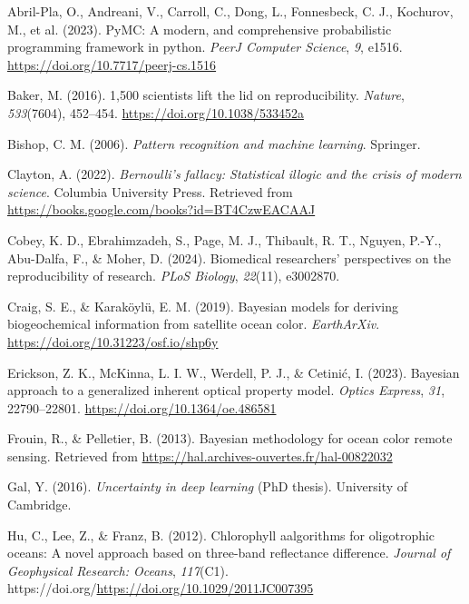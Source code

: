 \documentclass[
]{agujournal2019}
\newlength{\cslhangindent}
\newenvironment{CSLReferences}[2] %
 {\begin{list}{}{%
  \setlength{\itemindent}{0pt}
  \setlength{\leftmargin}{0pt}
  \setlength{\parsep}{0pt}
  \ifodd #1
   \setlength{\leftmargin}{\cslhangindent}
   \setlength{\itemindent}{-1\cslhangindent}
  \fi
  \setlength{\itemsep}{#2\baselineskip}}}
 {\end{list}}
\begin{document}
\label{refs}
\begin{CSLReferences}{1}{0}
\vspace{1em}

Abril-Pla, O., Andreani, V., Carroll, C., Dong, L., Fonnesbeck, C. J.,
Kochurov, M., et al. (2023). PyMC: A modern, and comprehensive
probabilistic programming framework in python. \emph{PeerJ Computer
Science}, \emph{9}, e1516. \url{https://doi.org/10.7717/peerj-cs.1516}

Baker, M. (2016). 1,500 scientists lift the lid on reproducibility.
\emph{Nature}, \emph{533}(7604), 452--454.
\url{https://doi.org/10.1038/533452a}

Bishop, C. M. (2006). \emph{Pattern recognition and machine learning}.
Springer.

Clayton, A. (2022). \emph{Bernoulli's fallacy: Statistical illogic and
the crisis of modern science}. Columbia University Press. Retrieved from
\url{https://books.google.com/books?id=BT4CzwEACAAJ}

Cobey, K. D., Ebrahimzadeh, S., Page, M. J., Thibault, R. T., Nguyen,
P.-Y., Abu-Dalfa, F., \& Moher, D. (2024). Biomedical researchers'
perspectives on the reproducibility of research. \emph{PLoS Biology},
\emph{22}(11), e3002870.

Craig, S. E., \& Karaköylü, E. M. (2019). Bayesian models for deriving
biogeochemical information from satellite ocean color.
\emph{EarthArXiv}. \url{https://doi.org/10.31223/osf.io/shp6y}

Erickson, Z. K., McKinna, L. I. W., Werdell, P. J., \& Cetinić, I.
(2023). Bayesian approach to a generalized inherent optical property
model. \emph{Optics Express}, \emph{31}, 22790--22801.
\url{https://doi.org/10.1364/oe.486581}

Frouin, R., \& Pelletier, B. (2013). Bayesian methodology for ocean
color remote sensing. Retrieved from
\url{https://hal.archives-ouvertes.fr/hal-00822032}

Gal, Y. (2016). \emph{Uncertainty in deep learning} (PhD thesis).
University of Cambridge.

Hu, C., Lee, Z., \& Franz, B. (2012). Chlorophyll aalgorithms for
oligotrophic oceans: A novel approach based on three-band reflectance
difference. \emph{Journal of Geophysical Research: Oceans},
\emph{117}(C1).
https://doi.org/\url{https://doi.org/10.1029/2011JC007395}


\end{CSLReferences}
\end{document}
